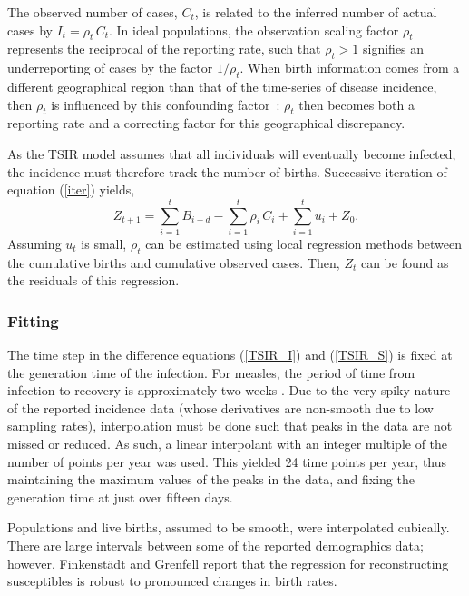 \documentclass[10pt]{article}
\begin{document}
The observed number of cases, $C_t$, is related to the inferred number of actual cases by $I_t = \rho_t\,C_t$. In ideal populations, the observation scaling factor $\rho_t$ represents the reciprocal of the reporting rate, such that $\rho_t > 1$ signifies an underreporting of cases by the factor $1/\rho_t$. When birth information comes from a different geographical region than that of the time-series of disease incidence, then $\rho_t$ is influenced by this confounding factor~: $\rho_t$ then becomes both a reporting rate and a correcting factor for this geographical discrepancy.

As the TSIR model assumes that all individuals will eventually become infected, the incidence must therefore track the number of births. Successive iteration of equation (\ref{iter}) yields,
\begin{equation}
Z_{t+1} = \sum_{i=1}^t B_{i-d} - \sum_{i=1}^t \rho_i \, C_i + \sum_{i=1}^t u_i + Z_0.
\label{sums}
\end{equation}
Assuming $u_t$ is small, $\rho_t$ can be estimated using local regression methods between the cumulative births and cumulative observed cases. Then, $Z_t$ can be found as the residuals of this regression. 

 







\subsubsection*{Fitting}

The time step in the difference equations (\ref{TSIR_I}) and (\ref{TSIR_S}) is fixed at the generation time of the infection. For measles, the period of time from infection to recovery is approximately two weeks \cite{Anderson1991}. Due to the very spiky nature of the reported incidence data (whose derivatives are non-smooth due to low sampling rates), interpolation must be done such that peaks in the data are not missed or reduced. As such, a linear interpolant with an integer multiple of the number of points per year was used. This yielded 24 time points per year, thus maintaining the maximum values of the peaks in the data, and fixing the generation time at just over fifteen days.

Populations and live births, assumed to be smooth, were interpolated cubically. There are large intervals between some of the reported demographics data; however, Finkenst\"{a}dt and Grenfell \cite{Finkenstadt2000} report that the regression for reconstructing susceptibles is robust to pronounced changes in birth rates.
\end{document}
